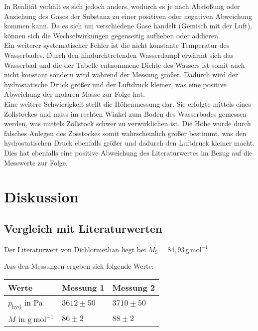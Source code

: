 \documentclass[12pt,a4paper,titlepage,headinclude,bibtotoc]{scrartcl}
\begin{document}
In Realität verhält es sich jedoch anders, wodurch es je nach Abstoßung oder Anziehung des Gases der Substanz zu einer positiven oder negativen Abweichung kommen kann. Da es sich um verschiedene Gase handelt (Gemisch mit der Luft), können sich die Wechselwirkungen gegenseitig aufheben oder addieren.\\ 

Ein weiterer systematischer Fehler ist die nicht konstante Temperatur des Wasserbades. Durch den hindurchtretenden Wasserdampf erwärmt sich das Wasserbad und die der Tabelle entnommene Dichte des Wassers ist somit auch nicht konstant sondern wird während der Messung größer. Dadurch wird der hydrostatische Druck größer und der Luftdruck kleiner, was eine positive Abweichung der molaren Masse zur Folge hat.\\


Eine weitere Schwierigkeit stellt die Höhenmessung dar. Sie erfolgte mittels eines Zollstockes und muss im rechten Winkel zum Boden des Wasserbades gemessen werden, was mittels Zollstock schwer zu verwirklichen ist. Die Höhe wurde durch falsches Anlegen des Zosstockes somit wahrscheinlich größer bestimmt, was den hydrostatischen Druck ebenfalls größer und dadurch den  Luftdruck kleiner macht. Dies hat ebenfalls eine positive Abweichung des Literaturwertes im Bezug auf die Messwerte zur Folge.
\\




\section{Diskussion}

\subsection{Vergleich mit Literaturwerten}
Der Literaturwert von Dichlormethan liegt bei 
$M_\mathrm{S} = 84,93\, \mathrm{g\,mol^{-1}}$\protect\footnotemark
\\




Aus den Messungen ergeben sich folgende Werte:\\


\begin{table} [h]
\centering
\begin{tabular}{|p{4 cm}||p{4 cm}|p{4 cm}|}
        \hline
		Werte & Messung 1 & Messung 2\\
         \hline 
        $ p_\mathrm{hyd}$ in Pa & $3612 \pm 50$  & $3710 \pm 50$ \\
        \hline
        $ M $ in $\mathrm{g{~}mol^{-1}}$ & $86 \pm 2$ & $88 \pm 2$ \\
        \hline     
\end{tabular}
\end{table}
\end{document}
